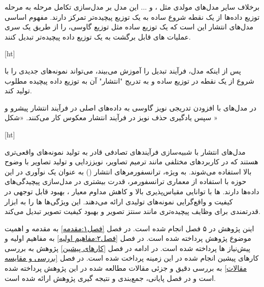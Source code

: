 برخلاف سایر مدل‌های مولدی مثل ،  و ... این مدل‌ بر مدل‌سازی تکامل مرحله به مرحله توزیع داده‌ها از یک نقطه شروع ساده به یک توزیع پیچیده‌تر تمرکز دارند. مفهوم اساسی مدل‌های انتشار این است که یک توزیع ساده مثل توزیع گاوسی، را از طریق یک سری عملیات های قابل برگشت به یک توزیع داده پیچیده‌تر تبدیل کنند.

[ht]

پس از اینکه مدل، فرآیند تبدیل را آموزش می‌بیند، می‌تواند نمونه‌های جدیدی را با شروع از یک نقطه در توزیع ساده و به تدریج "انتشار" آن به توزیع داده پیچیده مطلوب تولید کند.

در مدل‌های 
با افزودن تدریجی نویز گاوسی به داده‌های اصلی در فرآیند انتشار پیشرو و سپس یادگیری حذف نویز در فرآیند انتشار معکوس کار می‌کنند. «شکل »


[ht]




مدل‌های انتشار با شبیه‌سازی فرآیندهای تصادفی قادر به تولید نمونه‌های واقعی‌تری هستند که در کاربردهای مختلفی مانند ترمیم تصاویر، نویززدایی و تولید تصاویر با وضوح بالا استفاده می‌شوند. به ویژه، ترانسفورمرهای انتشار () به عنوان یک نوآوری در این حوزه با استفاده از معماری ترانسفورمر، قدرت بیشتری در مدل‌سازی پیچیدگی‌های داده‌ها دارند. ها با توانایی مقیاس‌پذیری بالا و کاهش مداوم معیار ، بهبود قابل توجهی در کیفیت و واقع‌گرایی نمونه‌های تولیدی ارائه می‌دهند. این ویژگی‌ها ها را به ابزار قدرتمندی برای وظایف پیچیده‌تری مانند سنتز تصویر و بهبود کیفیت تصویر تبدیل می‌کند.


اینن پژوهش در ۵ فصل انجام شده است. در فصل \ref{فصل۱:مقدمه} به مقدمه و اهمیت موضوع پژوهش پرداخته شده است. در فصل \ref{فصل۲:مفاهیم اولیه} به مفاهیم اولیه و پیش‌نیاز ها پرداخته شده است. در ادامه در فصل \ref{کارهای پیشین} پژوهش به بررسی کار‌های پیشین انجام شده در این زمینه پرداخت شده است. در فصل \ref{بررسی و مقایسه مقالات} به بررسی دقیق و جزئی مقالات مطالعه شده در این پژوهش پرداخته شده است و در فصل پایانی، جمع‌بندی و نتیجه گیری پژوهش ارائه شده است.